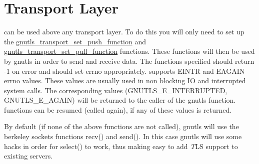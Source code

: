 \section{Transport Layer}
\par
\gnutls can be used above any transport layer. To do this you will only 
need to set up the 
\hyperref{gnutls\_transport\_set\_push\_function()}{gnutls\_transport\_set\_push\_function() (see Section }{
for more information)}{gnutls_transport_set_push_function} and
\hyperref{gnutls\_transport\_set\_pull\_function()}{gnutls\_transport\_set\_pull\_function() (see Section }{
for more information)}{gnutls_transport_set_pull_function}
functions. These functions will then be used by gnutls in order to send and receive data.
The functions specified should return -1 on error and should set errno appropriately.
\gnutls supports EINTR and EAGAIN errno values. These values are
usually used in non blocking IO and interrupted system calls.
The corresponding values (GNUTLS\_E\_INTERRUPTED, GNUTLS\_E\_AGAIN) 
will be returned to the caller of the gnutls function. \gnutls functions
can be resumed (called again), if any of these values is returned.
\par
By default (if none of the above functions are not called), gnutls will use
the berkeley sockets functions recv() and send(). In this case
gnutls will use some hacks in order for select() to work, thus
making easy to add {\emph TLS} support to existing servers.


